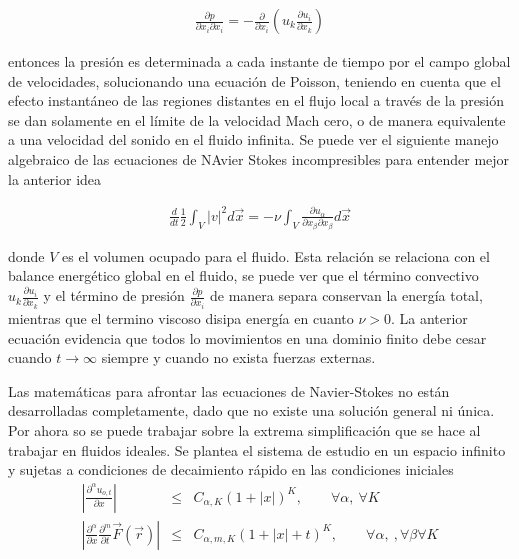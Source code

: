 \begin{eqnarray}
\frac{\partial p}{\partial x_{i}\partial x_{i}} = -\frac{\partial}{\partial x_{i}}\left(u_{k}\frac{\partial u_{i}}{\partial x_{k}}\right)
\end{eqnarray}

\noindent entonces la presión es determinada a cada instante de tiempo por el campo global de velocidades, solucionando una ecuación de Poisson, teniendo en cuenta que el efecto instantáneo de las regiones distantes en el flujo local a través de la presión se dan solamente en el límite de la velocidad Mach cero, o de manera equivalente a una velocidad del sonido en el fluido infinita. Se puede ver el siguiente manejo algebraico de las ecuaciones de NAvier Stokes incompresibles para entender mejor la anterior idea

\begin{eqnarray}
\frac{d}{dt}\frac{1}{2}\int_{V}|v|^{2}d\vec{x} = -\nu\int_{V}\frac{\partial u_{\alpha}}{\partial x_{\beta}\partial x_{\beta}}d\vec{x}  
\end{eqnarray}

\noindent donde $V$ es el volumen ocupado para el fluido. Esta relación se relaciona con el balance energético global en el fluido, se puede ver que el término convectivo $u_{k}\frac{\partial u_{i}}{\partial x_{k}}$ y el término de presión $\frac{\partial p}{\partial x_{i}}$  de manera separa conservan la energía total, mientras que el termino viscoso disipa energía en cuanto $\nu > 0$. La anterior ecuación evidencia que todos lo movimientos en una dominio finito debe cesar cuando $t\rightarrow\infty$ siempre y cuando no exista fuerzas externas. 

\noindent Las matemáticas para afrontar las ecuaciones de Navier-Stokes no están desarrolladas completamente, dado que no existe una solución general ni única. Por ahora so se puede trabajar sobre  la extrema simplificación que se hace al trabajar en fluidos ideales. Se plantea el sistema de estudio en un espacio infinito y sujetas a condiciones de decaimiento rápido en las condiciones iniciales 
\begin{eqnarray}
\label{regularidad}
\left|\frac{\partial^{\alpha}u_{o,t}}{\partial x}\right| &\leq& C_{\alpha,K}(1+|x|)^{K}, \qquad \forall \alpha, \ \forall K\\
\left|\frac{\partial^{\alpha}}{\partial x}\frac{\partial^{m}}{\partial t}\vec{F}(\vec{r})\right| &\leq& C_{\alpha,m,K}(1+|x|+t)^{K}, \qquad \forall \alpha, \ ,\forall \beta \forall K
\end{eqnarray}

